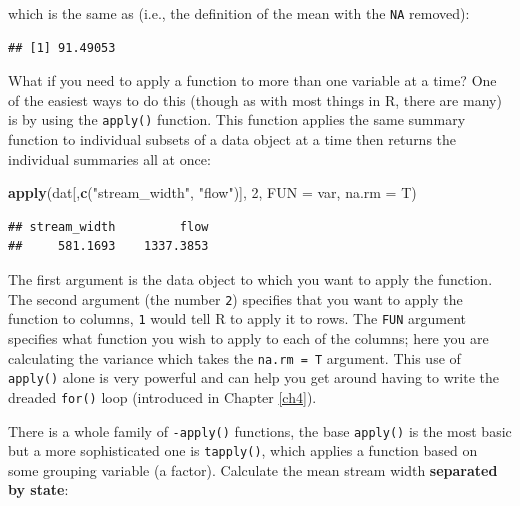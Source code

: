 \documentclass[]{book}
\newenvironment{Shaded}{\begin{snugshade}}{\end{snugshade}}
\newcommand{\KeywordTok}[1]{\textcolor[rgb]{0.13,0.29,0.53}{\textbf{#1}}}
\newcommand{\DataTypeTok}[1]{\textcolor[rgb]{0.13,0.29,0.53}{#1}}
\newcommand{\DecValTok}[1]{\textcolor[rgb]{0.00,0.00,0.81}{#1}}
\newcommand{\StringTok}[1]{\textcolor[rgb]{0.31,0.60,0.02}{#1}}
\newcommand{\OperatorTok}[1]{\textcolor[rgb]{0.81,0.36,0.00}{\textbf{#1}}}
\newcommand{\NormalTok}[1]{#1}
\theoremstyle{definition}
\theoremstyle{definition}
\theoremstyle{definition}
\theoremstyle{remark}
\begin{document}
which is the same as (i.e., the definition of the mean with the
\texttt{NA} removed):

\begin{Shaded}
\end{Shaded}

\begin{verbatim}
## [1] 91.49053
\end{verbatim}

What if you need to apply a function to more than one variable at a
time? One of the easiest ways to do this (though as with most things in
R, there are many) is by using the \texttt{apply()} function. This
function applies the same summary function to individual subsets of a
data object at a time then returns the individual summaries all at once:

\begin{Shaded}
\begin{Highlighting}[]
\KeywordTok{apply}\NormalTok{(dat[,}\KeywordTok{c}\NormalTok{(}\StringTok{"stream_width"}\NormalTok{, }\StringTok{"flow"}\NormalTok{)], }\DecValTok{2}\NormalTok{, }\DataTypeTok{FUN =}\NormalTok{ var, }\DataTypeTok{na.rm =}\NormalTok{ T)}
\end{Highlighting}
\end{Shaded}

\begin{verbatim}
## stream_width         flow 
##     581.1693    1337.3853
\end{verbatim}

The first argument is the data object to which you want to apply the
function. The second argument (the number \texttt{2}) specifies that you
want to apply the function to columns, \texttt{1} would tell R to apply
it to rows. The \texttt{FUN} argument specifies what function you wish
to apply to each of the columns; here you are calculating the variance
which takes the \texttt{na.rm\ =\ T} argument. This use of
\texttt{apply()} alone is very powerful and can help you get around
having to write the dreaded \texttt{for()} loop (introduced in Chapter
\ref{ch4}).

There is a whole family of \texttt{-apply()} functions, the base
\texttt{apply()} is the most basic but a more sophisticated one is
\texttt{tapply()}, which applies a function based on some grouping
variable (a factor). Calculate the mean stream width \textbf{separated
by state}:
\end{document}
